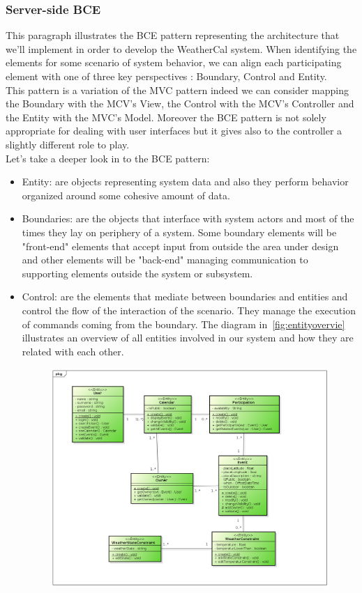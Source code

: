 \subsubsection{Server-side BCE}\label{sec:BCE}
This paragraph illustrates the BCE pattern representing the architecture that we'll implement in order to develop the WeatherCal system. When identifying the elements for some scenario of system behavior, we can align each participating element with one of three key perspectives : Boundary, Control and Entity. \\This  pattern is a variation of the MVC pattern indeed we can consider mapping the Boundary with the MCV's View, the Control with the MCV's Controller and the Entity with the MVC's Model. Moreover the BCE pattern is not solely appropriate for dealing with user interfaces but it gives also to the controller a slightly different role to play.\\Let's take a deeper look in to the BCE pattern:\begin{itemize}
\item Entity: are objects representing system data and also they perform behavior organized around some cohesive amount of data.
\item Boundaries: are the objects that interface with system actors and most of the times they lay on periphery of a system. Some boundary elements will be "front-end" elements that accept input from outside the area under design and other elements will be "back-end" managing communication to supporting elements outside the system or subsystem.
\item Control: are the elements that mediate between boundaries and entities and control the flow of the interaction of the scenario. They manage the execution of commands coming from the boundary.
The diagram in~\ref{fig:entityovervie} illustrates an overview of all entities involved in our system and how they are related with each other.
 \begin{center}
 \begin{figure}[H]
    \includegraphics[width=1\textwidth]{../BCEDiagram/BCE/EntityOverview/Entity.png}

\end{figure}
\end{center}
\end{itemize}
